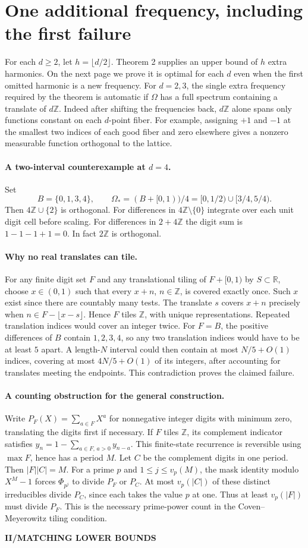\documentclass[11pt,a4paper]{article}
\newcommand{\kicker}[1]{\par{\sffamily\bfseries\color{teal}\small #1}\par}
\newcommand{\R}{\mathbb R}\newcommand{\Z}{\mathbb Z}\newcommand{\C}{\mathbb C}
\begin{document}
\section*{One additional frequency, including the first failure}
For each $d\ge2$, let $h=\lfloor d/2\rfloor$. Theorem 2 supplies an upper bound of $h$ extra harmonics. On the next page we prove it is optimal for each $d$ even when the first omitted harmonic is a new frequency. For $d=2,3$, the single extra frequency required by the theorem is automatic if $\Omega$ has a full spectrum containing a translate of $d\Z$. Indeed after shifting the frequencies back, $d\Z$ alone spans only functions constant on each $d$-point fiber. For example, assigning $+1$ and $-1$ at the smallest two indices of each good fiber and zero elsewhere gives a nonzero measurable function orthogonal to the lattice.
\paragraph{A two-interval counterexample at $d=4$.}
Set
\[
 B=\{0,1,3,4\},\qquad \Omega_*=(B+[0,1))/4=[0,1/2)\cup[3/4,5/4).
\]
Then $4\Z\cup\{2\}$ is orthogonal. For differences in $4\Z\setminus\{0\}$ integrate over each unit digit cell before scaling. For differences in $2+4\Z$ the digit sum is $1-1-1+1=0$. In fact $2\Z$ is orthogonal.
\paragraph{Why no real translates can tile.}
For any finite digit set $F$ and any translational tiling of $F+[0,1)$ by $S\subset\R$, choose $x\in(0,1)$ such that every $x+n$, $n\in\Z$, is covered exactly once. Such $x$ exist since there are countably many tests. The translate $s$ covers $x+n$ precisely when $n\in F-\lfloor x-s\rfloor$. Hence $F$ tiles $\Z$, with unique representations. Repeated translation indices would cover an integer twice. For $F=B$, the positive differences of $B$ contain $1,2,3,4$, so any two translation indices would have to be at least $5$ apart. A length-$N$ interval could then contain at most $N/5+O(1)$ indices, covering at most $4N/5+O(1)$ of its integers, after accounting for translates meeting the endpoints. This contradiction proves the claimed failure.
\paragraph{A counting obstruction for the general construction.}
Write $P_F(X)=\sum_{a\in F}X^a$ for nonnegative integer digits with minimum zero, translating the digits first if necessary. If $F$ tiles $\Z$, its complement indicator satisfies $y_n=1-\sum_{a\in F,\,a>0}y_{n-a}$. This finite-state recurrence is reversible using $\max F$, hence has a period $M$. Let $C$ be the complement digits in one period. Then $|F||C|=M$. For a prime $p$ and $1\le j\le v_p(M)$, the mask identity modulo $X^M-1$ forces $\Phi_{p^j}$ to divide $P_F$ or $P_C$. At most $v_p(|C|)$ of these distinct irreducibles divide $P_C$, since each takes the value $p$ at one. Thus at least $v_p(|F|)$ must divide $P_F$. This is the necessary prime-power count in the Coven--Meyerowitz tiling condition.
\clearpage
{}
\kicker{II\quad /\quad MATCHING LOWER BOUNDS}
\end{document}
